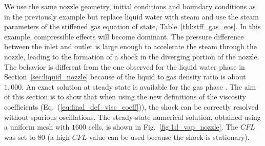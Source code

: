 \documentclass[preprint,10pt]{elsarticle}
\newcommand{\eqt}[1]{Eq.~(\ref{#1})}                     %
\newcommand{\fig}[1]{Fig.~\ref{#1}}                      %
\newcommand{\tbl}[1]{Table~\ref{#1}}                     %
\newcommand{\sct}[1]{Section~\ref{#1}}                   %
\begin{document}
We use the same nozzle geometry, initial conditions and boundary conditions as in the previously example but replace liquid water 
with steam and use the steam parameters of the stiffened gas equation of state, \tbl{tbl:stff_gas_eos}. In this example, 
compressible effects will become dominant. 
The pressure difference between the inlet and outlet is large enough to accelerate the steam through the nozzle, leading 
to the formation of a shock in the diverging portion of the nozzle. The behavior is different from the one observed for the 
liquid water phase in \sct{sec:liquid_nozzle} because of the liquid to gas density ratio is about $1,000$. An exact 
solution at steady state is available for the gas phase \cite{nozzle_exact}. The aim of this section is to show that 
when using the new definitions of the viscosity coefficients (\eqt{eq:final_def_visc_coeff}), the shock can be 
correctly resolved without spurious oscillations. The steady-state numerical solution, obtained using a uniform 
mesh with $1600$ cells, is shown in \fig{fig:1d_vap_nozzle}. The $CFL$ was set to $80$ (a high $CFL$ value can be used because the shock is stationary).
\end{document}
